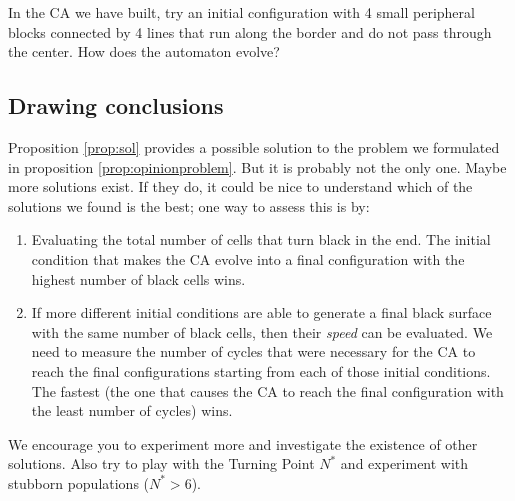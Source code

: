 \begin{problem}
\label{prob:opinionproof1}
In the CA we have built, try an initial configuration with 4 small peripheral blocks connected by 4 lines that
run along the border and do not pass through the center. How does the automaton evolve?
\end{problem}

\subsection{Drawing conclusions}
Proposition \ref{prop:sol} provides a possible solution to the problem we formulated in proposition \ref{prop:opinionproblem}.
But it is probably not the only one. Maybe more solutions exist. If they do, it could be nice to understand which of
the solutions we found is the best; one way to assess this is by:

\begin{enumerate}
\item Evaluating the total number of cells that turn black in the end. The initial condition that makes the CA
evolve into a final configuration with the highest number of black cells wins.
\item If more different initial conditions are able to generate a final black surface with the same number of black cells,
then their \textit{speed} can be evaluated. We need to measure the number of cycles that were necessary for the CA to
reach the final configurations starting from each of those initial conditions. 
The fastest (the one that causes the CA to reach
the final configuration with the least number of cycles) wins.
\end{enumerate}

We encourage you to experiment more and investigate the existence of other solutions. Also try to play with the
Turning Point $N^\ast$ and experiment with stubborn populations ($N^\ast > 6$).

